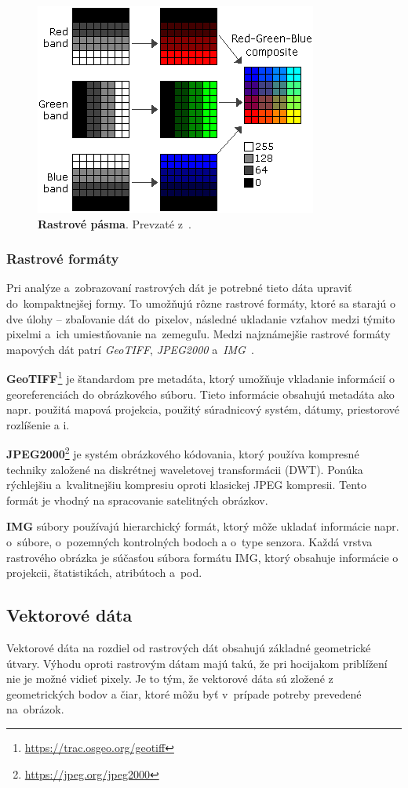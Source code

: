 \begin{figure}[ht]
    \centering
    \includegraphics[width=0.5\linewidth]{obrazky-figures/raster-bands.png}
    \caption{\textbf{Rastrové pásma}. Prevzaté z~\cite{arcgis-desktop}.}
    \label{fig:raster-bands}
\end{figure}

\subsubsection{Rastrové formáty}
Pri analýze a~zobrazovaní rastrových dát je potrebné tieto dáta upraviť do~kompaktnejšej formy. To umožňujú rôzne rastrové formáty, ktoré sa starajú o dve úlohy \--- zbaľovanie dát do~pixelov, následné ukladanie vzťahov medzi týmito pixelmi a~ich umiestňovanie na~zemeguľu. Medzi najznámejšie rastrové formáty mapových dát patrí \emph{GeoTIFF}, \emph{JPEG2000} a~\emph{IMG}~\cite{gis-formats}.

\textbf{GeoTIFF}\footnote{\url{https://trac.osgeo.org/geotiff}} je štandardom pre metadáta, ktorý umožňuje vkladanie informácií o georeferenciách do obrázkového súboru. Tieto informácie obsahujú metadáta ako napr. použitá mapová projekcia, použitý súradnicový systém, dátumy, priestorové rozlíšenie a i.

\textbf{JPEG2000}\footnote{\url{https://jpeg.org/jpeg2000}} je systém obrázkového kódovania, ktorý používa kompresné techniky založené na diskrétnej waveletovej transformácii (DWT). Ponúka rýchlejšiu a~kvalitnejšiu kompresiu oproti klasickej JPEG kompresii. Tento formát je vhodný na spracovanie satelitných obrázkov.

\textbf{IMG} súbory používajú hierarchický formát, ktorý môže ukladať informácie napr. o~súbore, o~pozemných kontrolných bodoch a o~type senzora. Každá vrstva rastrového obrázka je súčasťou súbora formátu IMG, ktorý obsahuje informácie o projekcii, štatistikách, atribútoch a~pod.

\subsection{Vektorové dáta}
Vektorové dáta na rozdiel od rastrových dát obsahujú základné geometrické útvary. Výhodu oproti rastrovým dátam majú takú, že pri hocijakom priblížení nie je možné vidieť pixely. Je to tým, že vektorové dáta sú zložené z geometrických bodov a čiar, ktoré môžu byť v~prípade potreby prevedené na~obrázok.

